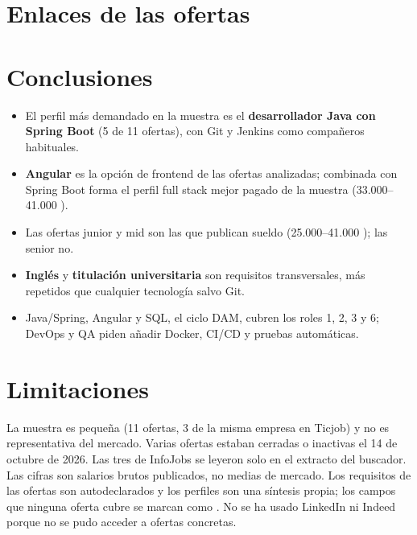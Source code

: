 \section{Enlaces de las ofertas}

\section{Conclusiones}
\begin{itemize}
\item El perfil m\'as demandado en la muestra es el \textbf{desarrollador Java con Spring Boot} (5 de 11 ofertas), con Git y Jenkins como compa\~neros habituales.
\item \textbf{Angular} es la opci\'on de frontend de las ofertas analizadas; combinada con Spring Boot forma el perfil full stack mejor pagado de la muestra (33.000--41.000 \texteuro{}).
\item Las ofertas junior y mid son las que publican sueldo (25.000--41.000 \texteuro{}); las senior no.
\item \textbf{Ingl\'es} y \textbf{titulaci\'on universitaria} son requisitos transversales, m\'as repetidos que cualquier tecnolog\'ia salvo Git.
\item Java/Spring, Angular y SQL, el ciclo DAM, cubren los roles 1, 2, 3 y 6; DevOps y QA piden a\~nadir Docker, CI/CD y pruebas autom\'aticas.
\end{itemize}

\section{Limitaciones}
La muestra es peque\~na (11 ofertas, 3 de la misma empresa en Ticjob) y no es representativa del mercado. Varias ofertas estaban cerradas o inactivas el 14 de octubre de 2026. Las tres de InfoJobs se leyeron solo en el extracto del buscador. Las cifras son salarios brutos publicados, no medias de mercado. Los requisitos de las ofertas son autodeclarados y los perfiles son una s\'intesis propia; los campos que ninguna oferta cubre se marcan como \nv. No se ha usado LinkedIn ni Indeed porque no se pudo acceder a ofertas concretas.


